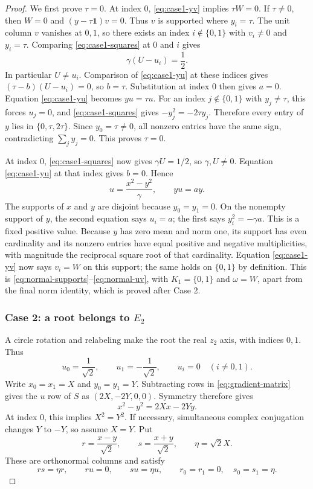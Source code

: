 \documentclass[11pt,reqno]{amsart}
\theoremstyle{definition}
\theoremstyle{remark}
\numberwithin{equation}{section}
\newcommand{\one}{\mathbf 1}
\begin{document}
\begin{proof}
We first prove $\tau=0$. At index $0$, \eqref{eq:case1-yv}
implies $\tau W=0$. If $\tau\ne0$, then $W=0$ and
$(y-\tau\one)v=0$. Thus $v$ is supported where $y_i=\tau$.
The unit column $v$ vanishes at $0,1$, so there exists an index
$i\notin\{0,1\}$ with $v_i\ne0$ and $y_i=\tau$.
Comparing \eqref{eq:case1-squares} at $0$ and $i$ gives
\[
 \gamma(U-u_i)=\frac12.
\]
In particular $U\ne u_i$. Comparison of \eqref{eq:case1-yu}
at these indices gives $(\tau-b)(U-u_i)=0$, so $b=\tau$.
Substitution at index $0$ then gives $a=0$.
Equation \eqref{eq:case1-yu} becomes $yu=\tau u$.
For an index $j\notin\{0,1\}$ with $y_j\ne\tau$, this forces
$u_j=0$, and \eqref{eq:case1-squares} gives
$-y_j^2=-2\tau y_j$. Therefore every entry of $y$ lies in
$\{0,\tau,2\tau\}$. Since $y_0=\tau\ne0$, all nonzero entries
have the same sign, contradicting $\sum_jy_j=0$.
This proves $\tau=0$.

At index $0$, \eqref{eq:case1-squares} now gives $\gamma U=1/2$,
so $\gamma,U\ne0$. Equation \eqref{eq:case1-yu} at that index
gives $b=0$. Hence
\begin{equation}\label{eq:case1-reduced}
 u=\frac{x^2-y^2}{\gamma},\qquad yu=a y.
\end{equation}
The supports of $x$ and $y$ are disjoint because $y_0=y_1=0$.
On the nonempty support of $y$, the second equation says $u_i=a$;
the first says $y_i^2=-\gamma a$. This is a fixed positive value.
Because $y$ has zero mean and norm one, its support has even
cardinality and its nonzero entries have equal positive and negative
multiplicities, with magnitude the reciprocal square root of that
cardinality. Equation \eqref{eq:case1-yv} now says $v_i=W$ on
this support; the same holds on $\{0,1\}$ by definition.
This is \eqref{eq:normal-supports}--\eqref{eq:normal-uv}, with
$K_1=\{0,1\}$ and $\omega=W$, apart from the final norm identity,
which is proved after Case 2.

\subsubsection*{Case 2: a root belongs to $E_2$}
A circle rotation and relabeling make the root the real $z_2$
axis, with indices $0,1$. Thus
\[
 u_0=\frac1{\sqrt2},\qquad u_1=-\frac1{\sqrt2},\qquad
 u_i=0\quad(i\ne0,1).
\]
Write $x_0=x_1=X$ and $y_0=y_1=Y$.
Subtracting rows in \eqref{eq:gradient-matrix} gives the $u$ row
of $S$ as $(2X,-2Y,0,0)$. Symmetry therefore gives
\[
 x^2-y^2=2Xx-2Yy.
\]
At index $0$, this implies $X^2=Y^2$. If necessary, simultaneous
complex conjugation changes $Y$ to $-Y$, so assume $X=Y$.
Put
\begin{equation}\label{eq:rs-def}
 r=\frac{x-y}{\sqrt2},\qquad
 s=\frac{x+y}{\sqrt2},\qquad \eta=\sqrt2X.
\end{equation}
These are orthonormal columns and satisfy
\begin{equation}\label{eq:case2-basic}
 rs=\eta r,\qquad ru=0,\qquad su=\eta u,
 \qquad r_0=r_1=0,\quad s_0=s_1=\eta.
\end{equation}


\end{proof}
\end{document}
